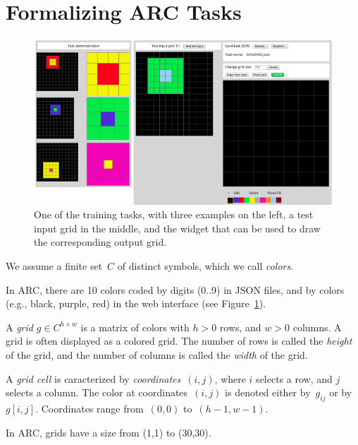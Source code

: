 \documentclass[a4paper]{llncs}
\begin{document}
\section{Formalizing ARC Tasks}
\label{arc}

\begin{figure}[t]
  \centering
  \includegraphics[width=\textwidth]{fig/training_b94a9452.png}
  \caption{One of the training tasks, with three examples on the left,
    a test input grid in the middle, and the widget that can be used
    to draw the corresponding output grid.}
  \label{fig:task}
\end{figure}

\begin{definition}[colors]
  We assume a finite set~$C$ of distinct symbols, which we call {\em colors}.
\end{definition}

In ARC, there are 10 colors coded by digits (0..9) in JSON files, and
by colors (e.g., black, purple, red) in the web interface (see
Figure~\ref{fig:task}).

\begin{definition}[grid]
  A {\em grid} $g \in C^{h \times w}$ is a matrix of colors with $h>0$
  rows, and $w>0$ columns. A grid is often displayed as a colored
  grid. The number of rows is called the {\em height} of the grid, and
  the number of columns is called the {\em width} of the grid.
  
  A {\em grid cell} is caracterized by {\em coordinates}~$(i,j)$,
  where $i$ selects a row, and $j$ selects a column. The color at
  coordinates~$(i,j)$ is denoted either by~$g_{ij}$ or by~$g[i,j]$.
  Coordinates range from~$(0,0)$ to~$(h-1,w-1)$.
\end{definition}

In ARC, grids have a size from (1,1) to (30,30).
\end{document}
